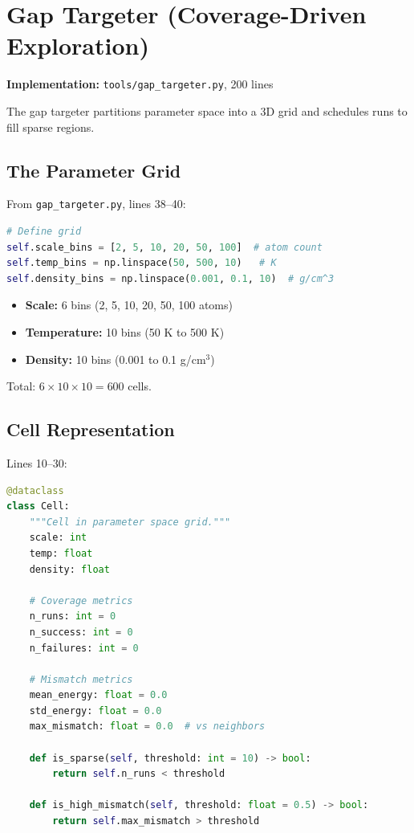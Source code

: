 \documentclass[11pt]{article}
\begin{document}
\section{Gap Targeter (Coverage-Driven Exploration)}

\textbf{Implementation:} \texttt{tools/gap\_targeter.py}, 200 lines

The gap targeter partitions parameter space into a 3D grid and schedules runs to fill sparse regions.

\subsection{The Parameter Grid}

From \texttt{gap\_targeter.py}, lines 38--40:

\begin{lstlisting}[language=Python]
# Define grid
self.scale_bins = [2, 5, 10, 20, 50, 100]  # atom count
self.temp_bins = np.linspace(50, 500, 10)   # K
self.density_bins = np.linspace(0.001, 0.1, 10)  # g/cm^3
\end{lstlisting}

\begin{itemize}
\item \textbf{Scale:} 6 bins (2, 5, 10, 20, 50, 100 atoms)
\item \textbf{Temperature:} 10 bins (50 K to 500 K)
\item \textbf{Density:} 10 bins (0.001 to 0.1 g/cm$^3$)
\end{itemize}

Total: $6 \times 10 \times 10 = 600$ cells.

\subsection{Cell Representation}

Lines 10--30:

\begin{lstlisting}[language=Python]
@dataclass
class Cell:
    """Cell in parameter space grid."""
    scale: int
    temp: float
    density: float
    
    # Coverage metrics
    n_runs: int = 0
    n_success: int = 0
    n_failures: int = 0
    
    # Mismatch metrics
    mean_energy: float = 0.0
    std_energy: float = 0.0
    max_mismatch: float = 0.0  # vs neighbors
    
    def is_sparse(self, threshold: int = 10) -> bool:
        return self.n_runs < threshold
    
    def is_high_mismatch(self, threshold: float = 0.5) -> bool:
        return self.max_mismatch > threshold
\end{lstlisting}
\end{document}
